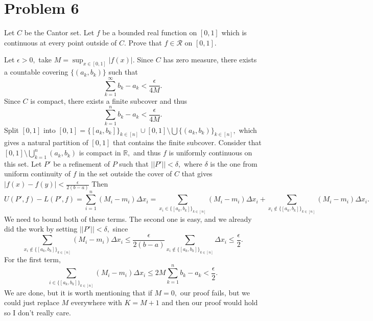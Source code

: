 \documentclass[11pt]{article}
\newcommand{\bbR}{\mathbb{R}}
\begin{document}
\section*{Problem 6}
\begin{problem}
    Let $C$ be the Cantor set. Let $f$ be a bounded real function on $[0,1]$ which is continuous at every point outside of $C.$ Prove that $f\in \mathcal{R}$ on $[0,1].$
\end{problem}
\begin{solution}
Let $\epsilon>0,$ take $M = \sup_{x\in [0,1]}|f(x)|.$ Since $C$ has zero measure, there exists a countable covering $\{(a_k, b_k)\}$ such that 
\[\sum_{k=1}^\infty b_k - a_k< \frac{\epsilon}{4M}.\] Since $C$ is compact, there exists a finite subcover and thus
\[\sum_{k=1}^n b_k - a_k < \frac{\epsilon}{4M}.\] Split $[0,1]$ into $[0,1] = \{[a_k, b_k]\}_{k\in [n]} \cup [0,1]\setminus \bigcup\{(a_k, b_k)\}_{k\in [n]},$ which gives a natural partition of $[0,1]$ that contains the finite subcover. Consider that $[0,1]\setminus \bigcup_{k=1}^n (a_k, b_k)$ is compact in $\bbR,$ and thus $f$ is uniformly continuous on this set. Let $P'$ be a refinement of $P$ such that $||P'||< \delta,$ where $\delta$ is the one from uniform continuity of $f$ in the set outside the cover of $C$ that gives $|f(x) - f(y)| < \frac{\epsilon}{2(b-a)}$ 
Then 
\[U(P',f) - L(P',f) = \sum_{i=1}^n (M_i - m_i)\Delta x_i = \sum_{x_i \in \{[a_k, b_k]\}_{k\in [n]}} (M_i - m_i)\Delta x_i + \sum_{x_i\notin \{[a_k, b_k]\}_{k\in [n]}}(M_i - m_i)\Delta x_i.\] We need to bound both of these terms. The second one is easy, and we already did the work by setting $||P'||< \delta,$ since
\[\sum_{x_i\notin \{[a_k, b_k]\}_{k\in [n]}}(M_i - m_i)\Delta x_i \leq \frac{\epsilon}{2(b-a)}\sum_{x_i\notin \{[a_k, b_k]\}_{k\in [n]}} \Delta x_i \leq \frac{\epsilon}{2}.\] For the first term, 
\[\sum_{i \in \{[a_k, b_k]\}_{k\in [n]}} (M_i - m_i)\Delta x_i \leq 2M \sum_{k=1}^n b_k - a_k < \frac{\epsilon}{2}.\] We are done, but it is worth mentioning that if $M=0,$ our proof fails, but we could just replace $M$ everywhere with $K =  M+1$ and then our proof would hold so I don't really care.
\end{solution}

\newpage
\end{document}
